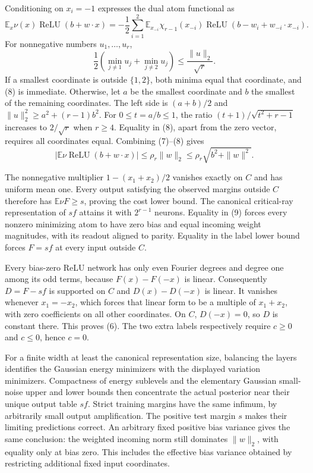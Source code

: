 \documentclass[11pt]{article}
\newcommand{\relu}{\operatorname{ReLU}}
\newcommand{\E}{\mathbb E}
\begin{document}
Conditioning on $x_i=-1$ expresses the dual atom functional as
\[
 \E_x\nu(x)\relu(b+w\cdot x)
  =-\frac12\sum_{i=1}^2
       \E_{x_{-i}}\chi_{r-1}(x_{-i})
                \relu(b-w_i+w_{-i}\cdot x_{-i}).
\]
For nonnegative numbers $u_1,\ldots,u_r$,
\[
 \frac12\left(\min_{j\ne1}u_j+\min_{j\ne2}u_j\right)
                         \le\frac{\|u\|_2}{\sqrt r}.      \tag{8}
\]
If a smallest coordinate is outside $\{1,2\}$, both minima equal
that coordinate, and (8) is immediate. Otherwise, let $a$ be the
smallest coordinate and $b$ the smallest of the remaining coordinates.
The left side is $(a+b)/2$ and $\|u\|_2^2\ge a^2+(r-1)b^2$.
For $0\le t=a/b\le1$, the ratio
$(t+1)/\sqrt{t^2+r-1}$ increases to $2/\sqrt r$ when $r\ge4$.
Equality in (8), apart from the zero vector, requires all coordinates
equal. Combining (7)--(8) gives
\[
 |\E\nu\relu(b+w\cdot x)|\le\rho_r\|w\|_2
                         \le\rho_r\sqrt{b^2+\|w\|^2}.     \tag{9}
\]

The nonnegative multiplier $1-(x_1+x_2)/2$ vanishes exactly on $C$
and has uniform mean one. Every output satisfying the observed margins
outside $C$ therefore has $\E\nu F\ge s$, proving the cost lower
bound. The canonical critical-ray representation of $sf$ attains it
with $2^{r-1}$ neurons. Equality in (9) forces every nonzero minimizing
atom to have zero bias and equal incoming weight magnitudes, with its
readout aligned to parity. Equality in the label lower bound forces
$F=sf$ at every input outside $C$.

Every bias-zero ReLU network has only even Fourier degrees and degree
one among its odd terms, because $F(x)-F(-x)$ is linear. Consequently
$D=F-sf$ is supported on $C$ and $D(x)-D(-x)$ is linear. It vanishes
whenever $x_1=-x_2$, which forces that linear form to be a multiple of
$x_1+x_2$, with zero coefficients on all other coordinates. On $C$,
$D(-x)=0$, so $D$ is constant there. This proves (6). The two extra
labels respectively require $c\ge0$ and $c\le0$, hence $c=0$.

For a finite width at least the canonical representation size, balancing
the layers identifies the Gaussian energy minimizers with the displayed
variation minimizers. Compactness of energy sublevels and the elementary
Gaussian small-noise upper and lower bounds then concentrate the actual
posterior near their unique output table $sf$. Strict training margins
have the same infimum, by arbitrarily small output amplification.
The positive test margin $s$ makes their limiting predictions correct.
An arbitrary fixed positive bias variance gives the same conclusion:
the weighted incoming norm still dominates $\|w\|_2$, with equality
only at bias zero. This includes the effective bias variance obtained
by restricting additional fixed input coordinates.
\end{document}
